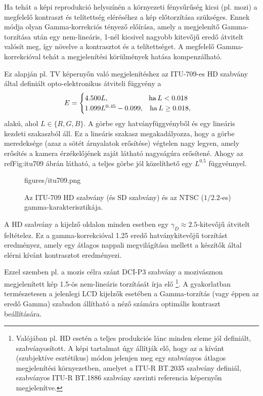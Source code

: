 Ha tehát a képi reprodukció helyszínén a környezeti fénysűrűség kicsi (pl. mozi) a megfelelő kontraszt és telítettség eléréséhez a kép előtorzítása szükséges.
Ennek módja olyan Gamma-korrekciós tényező előírása, amely a megjelenítő Gamma-torzítása után egy nem-lineáris, 1-nél kicsivel nagyobb kitevőjű eredő átvitelt valósít meg, így növelve a kontrasztot és a telítettséget.
A megfelelő Gamma-korrekcióval tehát a megjelenítési körülmények hatása kompenzálható.

Ez alapján pl. TV képernyőn való megjelenítéshez az ITU-709-es HD szabvány által definiált opto-elektronikus átviteli függvény a
\begin{equation}
E = 
\begin{cases}
4.500 L, \hspace{20mm} \mathrm{ha}\, L < 0.018 \\
1.099 L^{0.45} - 0.099, \hspace{3mm} \mathrm{ha}\, L \geq 0.018,
\end{cases}
\end{equation}
alakú, ahol $L \in \{ R, G, B \}$.
A görbe egy hatványfüggvényből és egy lineáris kezdeti szakaszból áll.
Ez a lineáris szakasz megakadályozza, hogy a görbe meredeksége (azaz a sötét árnyalatok erősítése) végtelen nagy legyen, amely erősítés a kamera érzékelőjének zaját látható nagyságúra erősítené.
Ahogy az ref{Fig:itu709} ábrán látható, a teljes görbe jól közelíthető egy $L^{0.5}$ függvénnyel.
\begin{figure}[]
	\centering
	\begin{overpic}[width = 0.7\columnwidth ]{figures/itu709.png}
	\end{overpic}
	\caption{Az ITU-709 HD szabvány (és SD szabvány) és az NTSC ($1/2.2$-es) gamma-karakterisztikája.}
	\label{Fig:itu709}
\end{figure}
A HD szabvány a kijelző oldalon minden esetben egy $\gamma_D \approx 2.5$-kitevőjű átvitelt feltételez.
Ez a gamma-korrekcióval 1.25 eredő hatványkitevőjű torzítást eredményez, amely egy átlagos nappali megvilágítása mellett a készítők által elérni kívánt kontrasztot eredményezi.

Ezzel szemben pl. a mozis célra szánt DCI-P3 szabvány a mozivásznon megjelenített kép 1.5-ös nem-lineáris torzítását írja elő \footnote{Valójában pl. HD esetén a teljes produkciós lánc minden eleme jól definiált, szabványosított.
A képi tartalmat úgy állítják elő, hogy az a kívánt (szubjektíve esztétikus) módon jelenjen meg egy szabványos átlagos megjelenítési környezetben, amelyet a ITU-R BT.2035 szabvány definiál, szabványos ITU-R BT.1886 szabvány szerinti referencia képernyőn megjelenítve.}.
A gyakorlatban természetesen a jelenlegi LCD kijelzők esetében a Gamma-torzítás (vagy éppen az eredő Gamma) szabadon állítható a néző számára optimális kontraszt beállítására.

